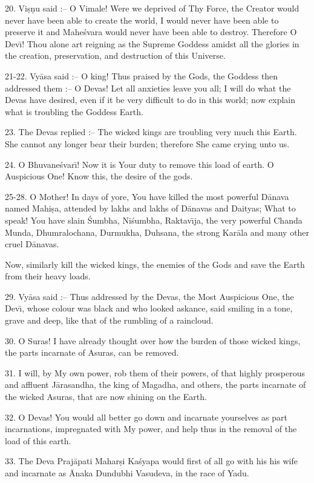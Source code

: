 20. Vi\d{s}\d{n}u said :-- O Vimale! Were we deprived of Thy Force, the Creator would never have been able to create the world, I would never have been able to preserve it and Mahe\'svara would never have been able to destroy. Therefore O Dev\={\i}! Thou alone art reigning as the Supreme Goddess amidst all the glories in the creation, preservation, and destruction of this Universe.

21-22. Vy\=asa said :-- O king! Thus praised by the Gods, the Goddess then addressed them :-- O Devas! Let all anxieties leave you all; I will do what the Devas have desired, even if it be very difficult to do in this world; now explain what is troubling the Goddess Earth.

23. The Devas replied :-- The wicked kings are troubling very much this Earth. She cannot any longer bear their burden; therefore She came crying unto us.

24. O Bhuvane\'svar\={\i}! Now it is Your duty to remove this load of earth. O Auspicious One! Know this, the desire of the gods.

25-28. O Mother! In days of yore, You have killed the most powerful D\=anava named Mahi\d{s}a, attended by lakhs and lakhs of D\=anavas and Daityas; What to speak! You have slain \'Sumbha, Ni\'sumbha, Raktav\={\i}ja, the very powerful Chanda Munda, Dhumralochana, Durmukha, Duhsana, the strong Kar\=ala and many other cruel D\=anavas.

Now, similarly kill the wicked kings, the enemies of the Gods and save the Earth from their heavy loads.

29. Vy\=asa said :-- Thus addressed by the Devas, the Most Auspicious One, the Dev\={\i}, whose colour was black and who looked askance, said smiling in a tone, grave and deep, like that of the rumbling of a raincloud.

30. O Suras! I have already thought over how the burden of those wicked kings, the parts incarnate of Asuras, can be removed.

31. I will, by My own power, rob them of their powers, of that highly prosperous and affluent J\=arasandha, the king of Magadha, and others, the parts incarnate of the wicked Asuras, that are now shining on the Earth.

32. O Devas! You would all better go down and incarnate yourselves as part incarnations, impregnated with My power, and help thus in the removal of the load of this earth.

33. The Deva Praj\=apati Mahar\d{s}i Ka\'syapa would first of all go with his his wife and incarnate as \=Anaka Dundubhi Vasudeva, in the race of Yadu.

